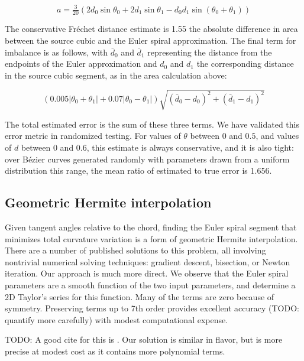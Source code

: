 \documentclass[format=acmsmall]{acmart}
\begin{document}
\[
    a = \tfrac{3}{20}(2d_0\sin \theta_0 + 2d_1\sin \theta_1 - d_0 d_1\sin(\theta_0+\theta_1))
\]

The conservative Fréchet distance estimate is 1.55 the absolute difference in area between the source cubic and the Euler spiral approximation. The final term for imbalance is as follows, with $\bar{d}_0$ and $\bar{d}_1$ representing the distance from the endpoints of the Euler approximation and $d_0$ and $d_1$ the corresponding distance in the source cubic segment, as in the area calculation above:

\[
    (0.005|\theta_0+\theta_1| + 0.07|\theta_0 - \theta_1|)\sqrt{(\bar{d}_0 - d_0)^2 + (\bar{d}_1 - d_1)^2}
\]

The total estimated error is the sum of these three terms. We have validated this error metric in randomized testing. For values of $\theta$ between $0$ and $0.5$, and values of $d$ between $0$ and $0.6$, this estimate is always conservative, and it is also tight: over Bézier curves generated randomly with parameters drawn from a uniform distribution this range, the mean ratio of estimated to true error is 1.656.


\subsection{Geometric Hermite interpolation}

Given tangent angles relative to the chord, finding the Euler spiral segment that minimizes total curvature variation is a form of geometric Hermite interpolation. There are a number of published solutions to this problem, all involving nontrivial numerical solving techniques: gradient descent\cite{Kimia2003}, bisection\cite{Walton2009}, or Newton iteration\cite{Connor2014}. Our approach is much more direct. We observe that the Euler spiral parameters are a smooth function of the two input parameters, and determine a 2D Taylor's series for this function. Many of the terms are zero because of symmetry. Preserving terms up to 7th order provides excellent accuracy (TODO: quantify more carefully) with modest computational expense.

TODO: A good cite for this is \cite{Reif2021}. Our solution is similar in flavor, but is more precise at modest cost as it contains more polynomial terms.
\end{document}
